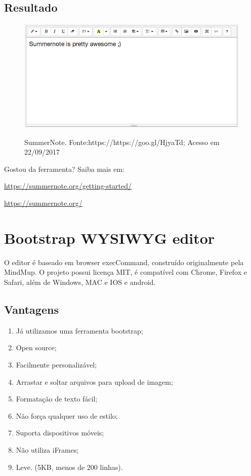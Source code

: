 \documentclass[12pt,a4paper]{article}
\begin{document}
\subsection{Resultado}

\begin{figure}[h]
\centering
\includegraphics[width=13cm]{recursos/SummerNote/SummerNote.jpg}
\label{3}
\caption{SummerNote. Fonte:https://https://goo.gl/HjyaTd; Acesso em 22/09/2017}
\end{figure}



Gostou da ferramenta? Saiba mais em:


\url{https://summernote.org/getting-started/}


\url{https://summernote.org/}

\section{Bootstrap WYSIWYG editor}
O editor é baseado em browser execCommand, construído originalmente pela MindMup. 
O projeto possui licença MIT, é compatível com Chrome, Firefox e Safari, além de Windows, MAC e IOS e android.

\subsection{Vantagens}
\begin{enumerate}
\item Já utilizamos uma ferramenta bootstrap;
\item Open source;
\item Facilmente personalizável;
\item Arrastar e soltar arquivos para upload de imagem;
\item Formatação de texto fácil;
\item Não força qualquer uso de estilo; 
\item Suporta dispositivos móveis;
\item Não utiliza iFrames;
\item Leve. (5KB, menos de 200 linhas).

\end{enumerate}
\end{document}
